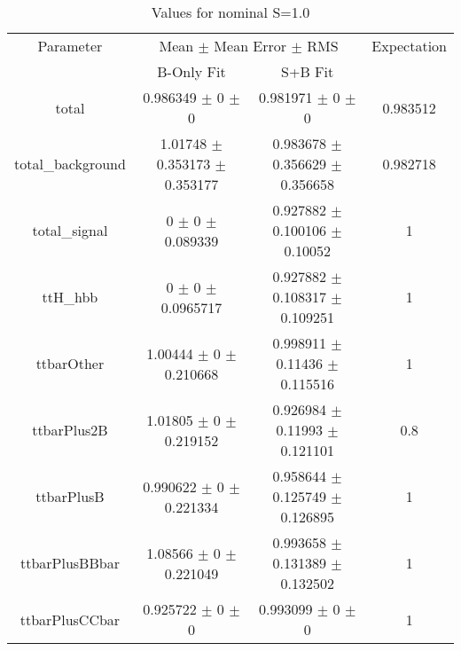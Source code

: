 \begin{table}
\centering
\caption{Values for nominal S=1.0}
\begin{tabular}{cccc}
\toprule
Parameter & \multicolumn{2}{c}{Mean $\pm$ Mean Error $\pm$ RMS} & Expectation\\
 & B-Only Fit & S+B Fit & \\
\midrule
total & \num{0.986349} $\pm$ \num{0} $\pm$ \num{0} & \num{0.981971} $\pm$ \num{0} $\pm$ \num{0} & \num{0.983512}\\
total\_background & \num{1.01748} $\pm$ \num{0.353173} $\pm$ \num{0.353177} & \num{0.983678} $\pm$ \num{0.356629} $\pm$ \num{0.356658} & \num{0.982718}\\
total\_signal & \num{0} $\pm$ \num{0} $\pm$ \num{0.089339} & \num{0.927882} $\pm$ \num{0.100106} $\pm$ \num{0.10052} & \num{1}\\
ttH\_hbb & \num{0} $\pm$ \num{0} $\pm$ \num{0.0965717} & \num{0.927882} $\pm$ \num{0.108317} $\pm$ \num{0.109251} & \num{1}\\
ttbarOther & \num{1.00444} $\pm$ \num{0} $\pm$ \num{0.210668} & \num{0.998911} $\pm$ \num{0.11436} $\pm$ \num{0.115516} & \num{1}\\
ttbarPlus2B & \num{1.01805} $\pm$ \num{0} $\pm$ \num{0.219152} & \num{0.926984} $\pm$ \num{0.11993} $\pm$ \num{0.121101} & \num{0.8}\\
ttbarPlusB & \num{0.990622} $\pm$ \num{0} $\pm$ \num{0.221334} & \num{0.958644} $\pm$ \num{0.125749} $\pm$ \num{0.126895} & \num{1}\\
ttbarPlusBBbar & \num{1.08566} $\pm$ \num{0} $\pm$ \num{0.221049} & \num{0.993658} $\pm$ \num{0.131389} $\pm$ \num{0.132502} & \num{1}\\
ttbarPlusCCbar & \num{0.925722} $\pm$ \num{0} $\pm$ \num{0} & \num{0.993099} $\pm$ \num{0} $\pm$ \num{0} & \num{1}\\
\bottomrule
\end{tabular}
\end{table}